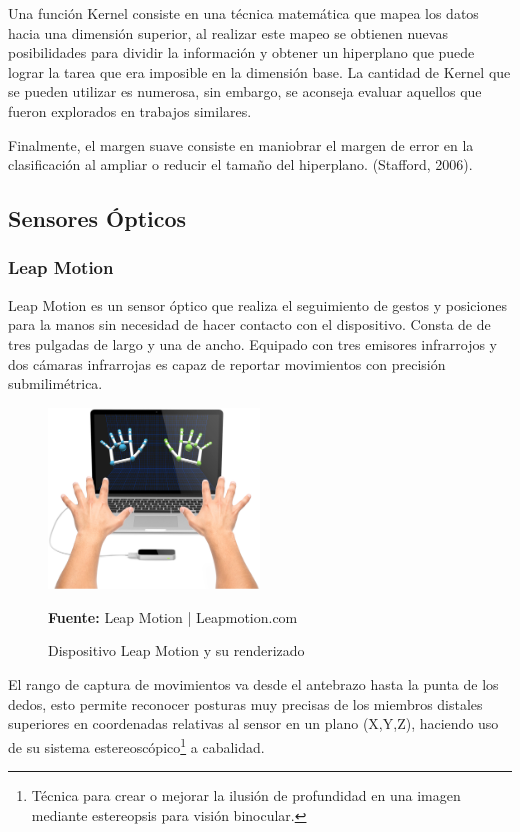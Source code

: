 Una función Kernel consiste en una técnica matemática que mapea los datos hacia una dimensión superior, al realizar este mapeo se obtienen nuevas posibilidades para dividir la información y obtener un hiperplano que puede lograr la tarea que era imposible en la dimensión base. La cantidad de Kernel que se pueden utilizar es numerosa, sin embargo, se aconseja evaluar aquellos que fueron explorados en trabajos similares. \parencite{Boswell2002IntroductionMachines}

Finalmente, el margen suave consiste en maniobrar el margen de error en la clasificación al ampliar o reducir el tamaño del hiperplano. (Stafford,
2006).


\subsection{Sensores Ópticos}
\subsubsection{Leap Motion}
Leap Motion es un sensor óptico que realiza el seguimiento de gestos y posiciones para la manos sin necesidad de hacer contacto con el dispositivo. Consta de de tres pulgadas de largo y una de ancho. Equipado con tres emisores infrarrojos y dos cámaras infrarrojas es capaz de reportar movimientos con precisión submilimétrica.  \parencite{Weichert2013AnalysisController.}

\begin{figure}[H]
    \centering
    \includegraphics[width=0.5\textwidth]{Anexos/LATEX/chapters/images/leapmotion.jpg}
    \caption{Dispositivo Leap Motion y su renderizado}
    \small{\textbf{Fuente:} Leap Motion | Leapmotion.com}
    \label{LeapOverview}
\end{figure}

El rango de captura de movimientos va desde el antebrazo hasta la punta de los dedos, esto permite reconocer posturas muy precisas de los miembros distales superiores en coordenadas relativas al sensor en un plano (X,Y,Z), haciendo uso de su sistema estereoscópico\footnote{Técnica para crear o mejorar la ilusión de profundidad en una imagen mediante estereopsis para visión binocular.} a cabalidad.

